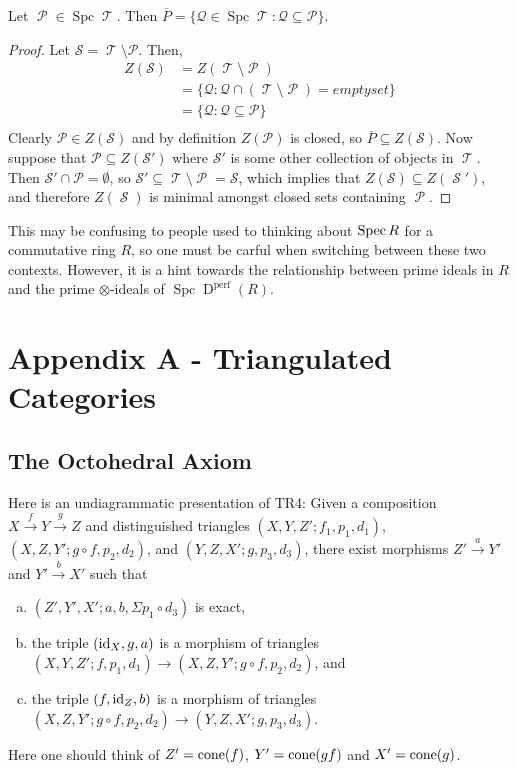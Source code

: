 \documentclass[11pt]{article}
\DeclareMathOperator{\cS}{\mathcal{S}}
\DeclareMathOperator{\TT}{\mathcal{T}}
\DeclareMathOperator{\cP}{\mathcal{P}}
\DeclareMathOperator{\spc}{Spc}
\begin{document}
\begin{prop}
Let $\cP \in \spc \TT$. Then $\overline{P} = \{\mathcal{Q} \in \spc \TT: \mathcal{Q} \subseteq \mathcal{P}\}$.
\end{prop}
\begin{proof}
Let $\mathcal{S} = \TT \setminus \mathcal{P}$. Then, 
\begin{align*}
Z(\mathcal{S}) 	&= Z(\TT \setminus \cP)\\
		&= \{\mathcal{Q}: \mathcal{Q} \cap (\TT \setminus \cP) = emptyset\}\\
		&= \{\mathcal{Q}: \mathcal{Q} \subseteq \mathcal{P}\}\\
\end{align*}
Clearly $\mathcal{P} \in Z(\mathcal{S})$ and by definition $Z(\mathscr{P})$ is closed, so $\overline{P} \subseteq Z(\mathcal{S})$. Now suppose that $\mathcal{P} \subseteq Z(\mathcal{S}')$ where $\mathcal{S}'$ is some other collection of objects in $\TT$. Then $\mathcal{S}' \cap \mathcal{P} = \emptyset$, so $\mathcal{S}' \subseteq \TT \setminus \cP = \mathcal{S}$, which implies that $Z(\mathcal{S}) \subseteq Z (\cS')$, and therefore $Z(\cS)$ is minimal amongst closed sets containing $\cP$.
\end{proof}

\begin{rmk}
This may be confusing to people used to thinking about $\operatorname{Spec} R$ for a commutative ring $R$, so one must be carful when switching between these two contexts. However, it is a hint towards the relationship between prime ideals in $R$ and the prime $\otimes$-ideals of $\spc \operatorname{D}^{\text{perf}}(R)$.
\end{rmk}

\newpage

\section{Appendix A - Triangulated Categories}
\subsection{The Octohedral Axiom}\label{octaxiom}
Here is an undiagrammatic presentation of TR4: Given a composition $X \xrightarrow{f} Y \xrightarrow{g} Z$ and distinguished triangles $(X,Y,Z'; f_1, p_1, d_1)$, $(X,Z,Y'; g\circ f, p_2, d_2)$, and $(Y,Z,X'; g, p_3, d_3)$, there exist morphisms $Z' \xrightarrow{a} Y'$ and $Y' \xrightarrow{b} X'$ such that
	\begin{enumerate}[(a)]
		\item $(Z',Y',X'; a,b,\Sigma p_1 \circ d_3)$ is exact,
		\item the triple $(\operatorname{id}_X,g,a)$ is a morphism of triangles $(X,Y,Z'; f,p_1,d_1) \to (X,Z,Y'; g\circ f,p_2,d_2)$, and
		\item the triple $(f,\operatorname{id}_Z,b)$ is a morphism of triangles $(X,Z,Y'; g\circ f, p_2, d_2) \to (Y,Z,X'; g, p_3, d_3)$.
	\end{enumerate}
	Here one should think of $Z' = \operatorname{cone}(f)$, $Y' = \operatorname{cone}(gf)$ and $X' = \operatorname{cone}(g)$.
\end{document}
